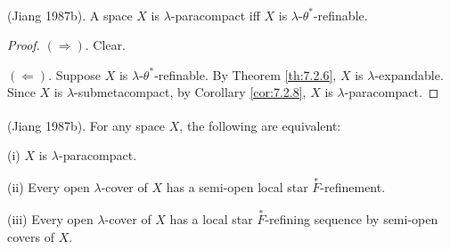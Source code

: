 \documentclass[jisng7iii.tex]{subfiles}
\begin{document}
{\theorem{} \label{th:7.2.9}
\textup{(\hstretch{1.8}{[}Jiang 1987b\hstretch{1.8}{]}\textsuperscript{\cite{Jiang1987b}})}.   
A space $X$ is $\lambda$-paracompact iff  $X$ is $\lambda$-$\theta^*$-refinable.
}

\begin{proof}
$(\Rightarrow)$. Clear. 

$(\Leftarrow)$. Suppose  $X$ is $\lambda$-$\theta^*$-refinable.  By Theorem \ref{th:7.2.6}, 
$X$ is $\lambda$-expandable. Since  $X$ is $\lambda$-submetacompact, by Corollary \ref{cor:7.2.8},  
$X$ is $\lambda$-paracompact.
\end{proof}

{\theorem{} \label{th:7.2.10}
\textup{(\hstretch{1.8}{[}Jiang 1987b\hstretch{1.8}{]}\textsuperscript{\cite{Jiang1987b}})}.   
For any space $X$, the following are equivalent:

\textup{(i)}   $X$ is $\lambda$-paracompact.

\textup{(ii)}  Every open $\lambda$-cover of  $X$ has a semi-open local star $\overset{*}{F}$-refinement.

\textup{(iii)}   Every open $\lambda$-cover of  $X$ has a local star $\overset{*}{F}$-refining sequence by semi-open covers of  $X$.
}
\end{document}
